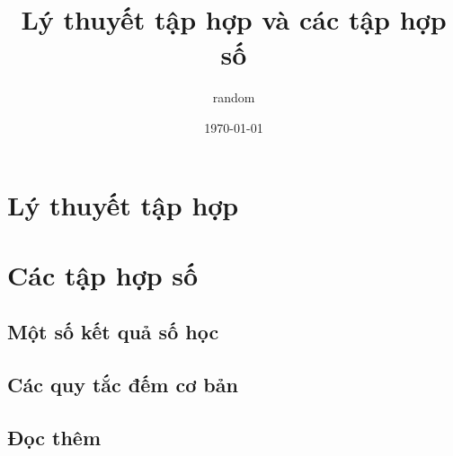 \documentclass[oneside]{book}
\title{Lý thuyết tập hợp và các tập hợp số}
\author{random}
\date{\today}
\theoremstyle{definition}
\begin{document}
\maketitle




\tableofcontents

\part{Lý thuyết tập hợp}\label{part1}





\part{Các tập hợp số}\label{part2}





\appendix

\chapter{Một số kết quả số học}

\chapter{Các quy tắc đếm cơ bản}

\chapter{Đọc thêm}

\printindex
\end{document}
